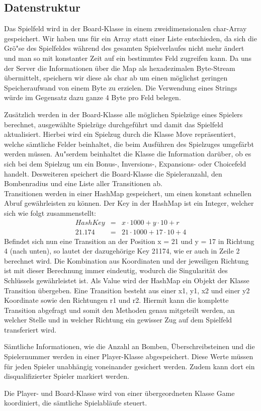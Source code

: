 \newpage

\subsection{Datenstruktur}\label{subsec:datenstruktur}
Das Spielfeld wird in der Board-Klasse in einem zweidimensionalen char-Array gespeichert.
Wir haben uns f\"ur ein Array statt einer Liste entschieden, da sich die Gr\"o"se des Spielfeldes w\"ahrend des gesamten Spielverlaufes nicht mehr \"andert und man so mit konstanter Zeit auf ein bestimmtes Feld zugreifen kann.
Da uns der Server die Informationen \"uber die Map als hexadezimalen Byte-Stream \"ubermittelt, speichern wir diese als char ab um einen m\"oglichst geringen Speicheraufwand von einem Byte zu erzielen.
Die Verwendung eines Strings w\"urde im Gegensatz dazu ganze 4 Byte pro Feld belegen.

Zus\"atzlich werden in der Board-Klasse alle m\"oglichen Spielz\"uge eines Spielers berechnet, ausgew\"ahlte Spielz\"uge durchgef\"uhrt und damit das Spielfeld aktualisiert.
Hierbei wird ein Spielzug durch die Klasse Move repr\"asentiert, welche s\"amtliche Felder beinhaltet, die beim Ausf\"uhren des Spielzuges umgef\"arbt werden m\"ussen.
Au"serdem beinhaltet die Klasse die Information dar\"uber, ob es sich bei dem Spielzug um ein Bonus-, Inversions-, Expansions- oder Choicefeld handelt.
Desweiteren speichert die Board-Klasse die Spieleranzahl, den Bombenradius und eine Liste aller Transitionen ab. \\
Transitionen werden in einer HashMap gespeichert, um einen konstant schnellen Abruf gew\"ahrleisten zu k\"onnen.
Der Key in der HashMap ist ein Integer, welcher sich wie folgt zusammenstellt:
\begin{align}
    HashKey &=& x \cdot 1000 + y \cdot 10 + r \\
    21.174 &=& 21 \cdot 1000 + 17 \cdot 10 + 4
\end{align}
Befindet sich nun eine Transition an der Position x = 21 und y = 17 in Richtung 4 (nach unten), so lautet der dazugeh\"orige Key 21174, wie er auch in Zeile 2 berechnet wird.
Die Kombination aus Koordinaten und der jeweiligen Richtung ist mit dieser Berechnung immer eindeutig, wodurch die Singularit\"at des Schl\"ussels gew\"ahrleistet ist.
Als Value wird der HashMap ein Objekt der Klasse Transition \"ubergeben.
Eine Transition besteht aus einer x1, y1, x2 und einer y2 Koordinate sowie den Richtungen r1 und r2.
Hiermit kann die komplette Transition abgefragt und somit den Methoden genau mitgeteilt werden, an welcher Stelle und in welcher Richtung ein gewisser Zug auf dem Spielfeld transferiert wird.

S\"amtliche Informationen, wie die Anzahl an Bomben, \"Uberschreibsteinen und die Spielernummer werden in einer Player-Klasse abgespeichert.
Diese Werte m\"ussen f\"ur jeden Spieler unabh\"angig voneinander gesichert werden.
Zudem kann dort ein disqualifizierter Spieler markiert werden.

Die Player- und Board-Klasse wird von einer \"ubergeordneten Klasse Game koordiniert, die s\"amtliche Spielabl\"aufe steuert.


\bigskip
\newpage